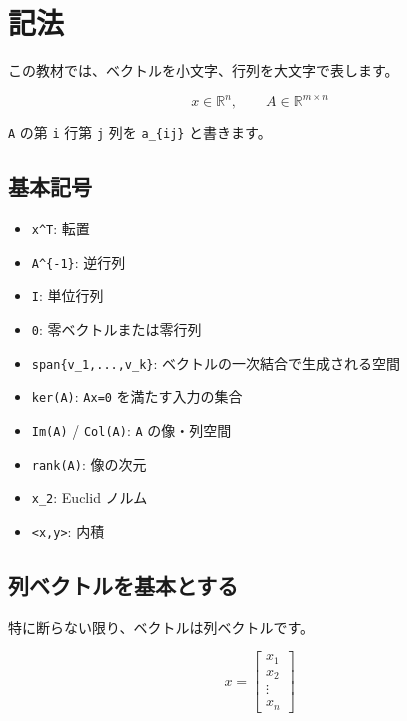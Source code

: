 \documentclass[
  11pt,
  a4paper,
]{ltjsarticle}
\author{}
\date{}
\providecommand{\tightlist}{%
  \setlength{\itemsep}{0pt}\setlength{\parskip}{0pt}}
\begin{document}
\hypertarget{ux8a18ux6cd5}{%
\section{記法}\label{ux8a18ux6cd5}}

この教材では、ベクトルを小文字、行列を大文字で表します。

\[
x\in\mathbb{R}^n,\qquad A\in\mathbb{R}^{m\times n}
\]

\texttt{A} の第 \texttt{i} 行第 \texttt{j} 列を \texttt{a\_\{ij\}}
と書きます。

\hypertarget{ux57faux672cux8a18ux53f7}{%
\subsection{基本記号}\label{ux57faux672cux8a18ux53f7}}

\begin{itemize}
\tightlist
\item
  \texttt{x\^{}T}: 転置
\item
  \texttt{A\^{}\{-1\}}: 逆行列
\item
  \texttt{I}: 単位行列
\item
  \texttt{0}: 零ベクトルまたは零行列
\item
  \texttt{span\{v\_1,...,v\_k\}}: ベクトルの一次結合で生成される空間
\item
  \texttt{ker(A)}: \texttt{Ax=0} を満たす入力の集合
\item
  \texttt{Im(A)} / \texttt{Col(A)}: \texttt{A} の像・列空間
\item
  \texttt{rank(A)}: 像の次元
\item
  \texttt{\textbar{}\textbar{}x\textbar{}\textbar{}\_2}: Euclid ノルム
\item
  \texttt{\textless{}x,y\textgreater{}}: 内積
\end{itemize}

\hypertarget{ux5217ux30d9ux30afux30c8ux30ebux3092ux57faux672cux3068ux3059ux308b}{%
\subsection{列ベクトルを基本とする}\label{ux5217ux30d9ux30afux30c8ux30ebux3092ux57faux672cux3068ux3059ux308b}}

特に断らない限り、ベクトルは列ベクトルです。

\[
x=\begin{bmatrix}x_1\\x_2\\\vdots\\x_n\end{bmatrix}
\]
\end{document}

